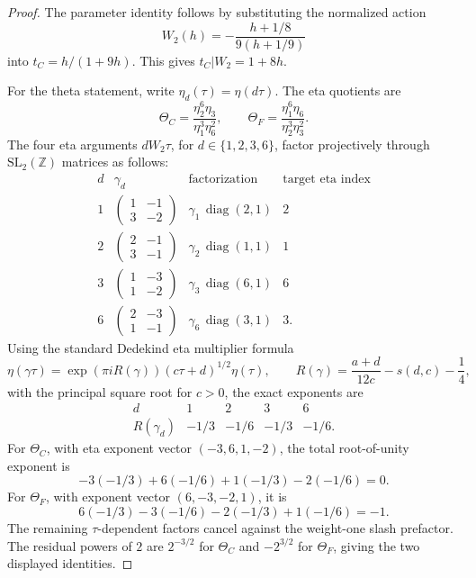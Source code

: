 \documentclass[11pt,a4paper]{article}
\DeclareMathOperator{\diag}{diag}
\begin{document}
\begin{proof}
The parameter identity follows by substituting the normalized action
\[
  W_2(h)=-\frac{h+1/8}{9(h+1/9)}
\]
into \(t_C=h/(1+9h)\).  This gives \(t_C|W_2=1+8h\).

For the theta statement, write \(\eta_d(\tau)=\eta(d\tau)\).  The eta quotients
are
\[
  \Theta_C=\frac{\eta_2^6\eta_3}{\eta_1^3\eta_6^2},
  \qquad
  \Theta_F=\frac{\eta_1^6\eta_6}{\eta_2^3\eta_3^2}.
\]
The four eta arguments \(dW_2\tau\), for \(d\in\{1,2,3,6\}\), factor
projectively through \(\mathrm{SL}_2(\mathbb Z)\) matrices as follows:
\[
\begin{array}{c|c|c|c}
d & \gamma_d & \text{factorization} & \text{target eta index}\\
\hline
1 & \begin{pmatrix}1&-1\\3&-2\end{pmatrix}
  & \gamma_1\,\diag(2,1) & 2\\
2 & \begin{pmatrix}2&-1\\3&-1\end{pmatrix}
  & \gamma_2\,\diag(1,1) & 1\\
3 & \begin{pmatrix}1&-3\\1&-2\end{pmatrix}
  & \gamma_3\,\diag(6,1) & 6\\
6 & \begin{pmatrix}2&-3\\1&-1\end{pmatrix}
  & \gamma_6\,\diag(3,1) & 3 .
\end{array}
\]
Using the standard Dedekind eta multiplier formula
\[
  \eta(\gamma\tau)=\exp(\pi i R(\gamma))(c\tau+d)^{1/2}\eta(\tau),
  \qquad
  R(\gamma)=\frac{a+d}{12c}-s(d,c)-\frac14,
\]
with the principal square root for $c>0$, the exact exponents are
\[
\begin{array}{c|cccc}
d&1&2&3&6\\
\hline
R(\gamma_d)&-1/3&-1/6&-1/3&-1/6 .
\end{array}
\]
For \(\Theta_C\), with eta exponent vector \((-3,6,1,-2)\), the total
root-of-unity exponent is
\[
  -3(-1/3)+6(-1/6)+1(-1/3)-2(-1/6)=0.
\]
For \(\Theta_F\), with exponent vector \((6,-3,-2,1)\), it is
\[
  6(-1/3)-3(-1/6)-2(-1/3)+1(-1/6)=-1.
\]
The remaining \(\tau\)-dependent factors cancel against the weight-one slash
prefactor.  The residual powers of \(2\) are \(2^{-3/2}\) for \(\Theta_C\) and
\(-2^{3/2}\) for \(\Theta_F\), giving the two displayed identities.
\end{proof}
\end{document}

